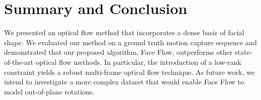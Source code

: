 \section{Summary and Conclusion}\label{sec:face_flow_conclusion}
We presented an optical flow method that incorporates a dense
basis of facial shape. We evaluated our method on a ground truth motion capture
sequence and demonstrated that our proposed algorithm, Face Flow, outperforms
other state-of-the-art optical flow methods. In particular, the introduction
of a low-rank constraint yields a robust multi-frame optical flow technique.
As future work, we intend to investigate a more complex dataset that would enable
Face Flow to model out-of-plane rotations.
